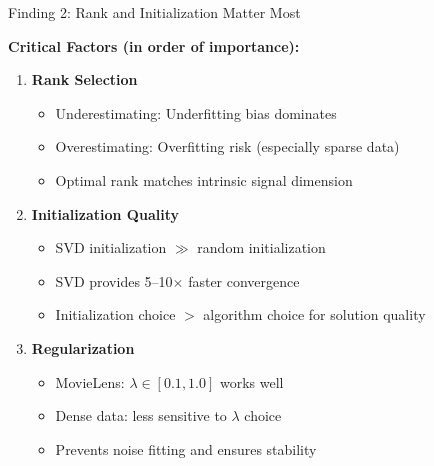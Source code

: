 \documentclass[aspectratio=169,usenames,dvipsnames]{beamer}
\begin{document}
\begin{frame}{Finding 2: Rank and Initialization Matter Most}
    
    \textbf{Critical Factors (in order of importance):}
    
    \vspace{0.3cm}
    
    \begin{enumerate}
        \item \textcolor{emoryblue}{\textbf{Rank Selection}}
        \begin{itemize}
            \item Underestimating: Underfitting bias dominates
            \item Overestimating: Overfitting risk (especially sparse data)
            \item Optimal rank matches intrinsic signal dimension
        \end{itemize}
        
        \vspace{0.2cm}
        
        \item \textcolor{emoryblue}{\textbf{Initialization Quality}}
        \begin{itemize}
            \item SVD initialization $\gg$ random initialization
            \item SVD provides 5--10$\times$ faster convergence
            \item Initialization choice $>$ algorithm choice for solution quality
        \end{itemize}
        
        \vspace{0.2cm}
        
        \item \textcolor{emoryblue}{\textbf{Regularization}}
        \begin{itemize}
            \item MovieLens: $\lambda \in [0.1, 1.0]$ works well
            \item Dense data: less sensitive to $\lambda$ choice
            \item Prevents noise fitting and ensures stability
        \end{itemize}
    \end{enumerate}
\end{frame}
\end{document}
